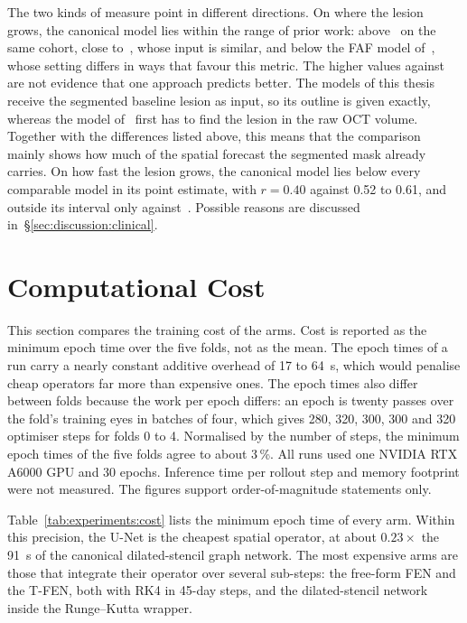 The two kinds of measure point in different directions. On where the
lesion grows, the canonical model lies within the range of prior work:
above~\citet{Mai2024} on the same cohort, close to~\citet{Gigon2021}, whose
input is similar, and below the FAF model of~\citet{Salvi2025}, whose
setting differs in ways that favour this metric. The higher values
against~\citet{Mai2024} are not evidence that one approach predicts better.
The models of this thesis receive the segmented baseline lesion as input,
so its outline is given exactly, whereas the model of~\citet{Mai2024} first
has to find the lesion in the raw OCT volume. Together with the
differences listed above, this means that the comparison mainly shows how
much of the spatial forecast the segmented mask already carries. On how
fast the lesion grows, the canonical model lies below every comparable
model in its point estimate, with $r = 0.40$ against 0.52 to 0.61, and
outside its interval only against~\citet{Mai2024}. Possible reasons are discussed
in~\S\ref{sec:discussion:clinical}.


\section{Computational Cost}
\label{sec:experiments:cost}

This section compares the training cost of the arms. Cost is reported as
the minimum epoch time over the five folds, not as the mean. The epoch
times of a run carry a nearly constant additive overhead of 17 to 64~s,
which would penalise cheap operators far more than expensive ones. The
epoch times also differ between folds because the work per epoch differs:
an epoch is twenty passes over the fold's training eyes in batches of four,
which gives 280, 320, 300, 300 and 320 optimiser steps for folds 0 to 4.
Normalised by the number of steps, the minimum epoch times of the five
folds agree to about 3\,\%. All runs used one NVIDIA RTX A6000 GPU and 30
epochs. Inference time per rollout step and memory footprint were not
measured. The figures support order-of-magnitude statements only.

Table~\ref{tab:experiments:cost} lists the minimum epoch time of every
arm. Within this precision, the U-Net is the cheapest spatial operator, at
about $0.23\times$ the 91~s of the canonical dilated-stencil graph network.
The most expensive arms are those that integrate their operator over
several sub-steps: the free-form FEN and the T-FEN, both with RK4 in 45-day
steps, and the dilated-stencil network inside the Runge--Kutta wrapper.

